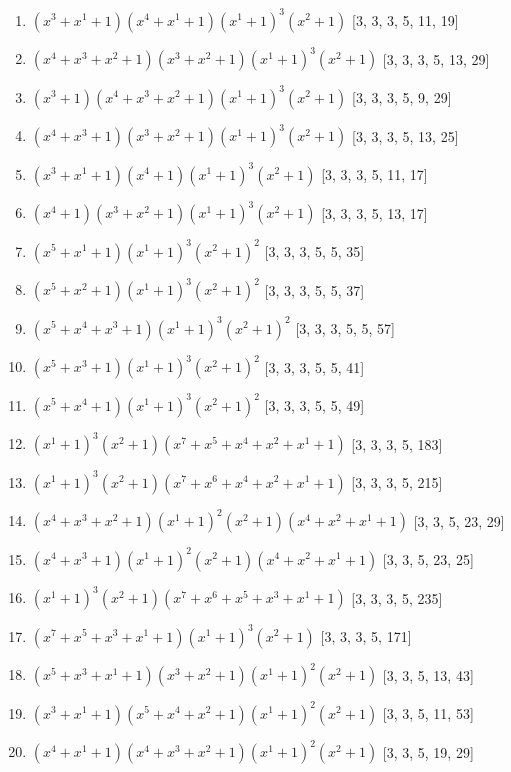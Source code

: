 \documentclass[10pt,twocolumn]{article}
\begin{document}
\begin{enumerate}
\item $(x^{3} + x^{1} + 1)(x^{4} + x^{1} + 1)(x^{1} + 1)^{3}(x^{2} + 1)$  [3, 3, 3, 5, 11, 19]
\item $(x^{4} + x^{3} + x^{2} + 1)(x^{3} + x^{2} + 1)(x^{1} + 1)^{3}(x^{2} + 1)$  [3, 3, 3, 5, 13, 29]
\item $(x^{3} + 1)(x^{4} + x^{3} + x^{2} + 1)(x^{1} + 1)^{3}(x^{2} + 1)$  [3, 3, 3, 5, 9, 29]
\item $(x^{4} + x^{3} + 1)(x^{3} + x^{2} + 1)(x^{1} + 1)^{3}(x^{2} + 1)$  [3, 3, 3, 5, 13, 25]
\item $(x^{3} + x^{1} + 1)(x^{4} + 1)(x^{1} + 1)^{3}(x^{2} + 1)$  [3, 3, 3, 5, 11, 17]
\item $(x^{4} + 1)(x^{3} + x^{2} + 1)(x^{1} + 1)^{3}(x^{2} + 1)$  [3, 3, 3, 5, 13, 17]
\item $(x^{5} + x^{1} + 1)(x^{1} + 1)^{3}(x^{2} + 1)^{2}$  [3, 3, 3, 5, 5, 35]
\item $(x^{5} + x^{2} + 1)(x^{1} + 1)^{3}(x^{2} + 1)^{2}$  [3, 3, 3, 5, 5, 37]
\item $(x^{5} + x^{4} + x^{3} + 1)(x^{1} + 1)^{3}(x^{2} + 1)^{2}$  [3, 3, 3, 5, 5, 57]
\item $(x^{5} + x^{3} + 1)(x^{1} + 1)^{3}(x^{2} + 1)^{2}$  [3, 3, 3, 5, 5, 41]
\item $(x^{5} + x^{4} + 1)(x^{1} + 1)^{3}(x^{2} + 1)^{2}$  [3, 3, 3, 5, 5, 49]
\item $(x^{1} + 1)^{3}(x^{2} + 1)(x^{7} + x^{5} + x^{4} + x^{2} + x^{1} + 1)$  [3, 3, 3, 5, 183]
\item $(x^{1} + 1)^{3}(x^{2} + 1)(x^{7} + x^{6} + x^{4} + x^{2} + x^{1} + 1)$  [3, 3, 3, 5, 215]
\item $(x^{4} + x^{3} + x^{2} + 1)(x^{1} + 1)^{2}(x^{2} + 1)(x^{4} + x^{2} + x^{1} + 1)$  [3, 3, 5, 23, 29]
\item $(x^{4} + x^{3} + 1)(x^{1} + 1)^{2}(x^{2} + 1)(x^{4} + x^{2} + x^{1} + 1)$  [3, 3, 5, 23, 25]
\item $(x^{1} + 1)^{3}(x^{2} + 1)(x^{7} + x^{6} + x^{5} + x^{3} + x^{1} + 1)$  [3, 3, 3, 5, 235]
\item $(x^{7} + x^{5} + x^{3} + x^{1} + 1)(x^{1} + 1)^{3}(x^{2} + 1)$  [3, 3, 3, 5, 171]
\item $(x^{5} + x^{3} + x^{1} + 1)(x^{3} + x^{2} + 1)(x^{1} + 1)^{2}(x^{2} + 1)$  [3, 3, 5, 13, 43]
\item $(x^{3} + x^{1} + 1)(x^{5} + x^{4} + x^{2} + 1)(x^{1} + 1)^{2}(x^{2} + 1)$  [3, 3, 5, 11, 53]
\item $(x^{4} + x^{1} + 1)(x^{4} + x^{3} + x^{2} + 1)(x^{1} + 1)^{2}(x^{2} + 1)$  [3, 3, 5, 19, 29]

\end{enumerate}
\end{document}

